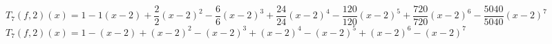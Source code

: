 \documentclass[a4paper]{article}
\begin{document}
$T_7(f,2)(x) = 1 - 1(x-2) + \dfrac{2}{2}(x-2)^2 - \dfrac{6}{6}(x-2)^3 + \dfrac{24}{24}(x-2)^4 - \dfrac{120}{120}(x-2)^5 + \dfrac{720}{720}(x-2)^6 - \dfrac{5040}{5040}(x-2)^7$ \\

$T_7(f,2)(x) = 1 - (x-2) + (x-2)^2 - (x-2)^3 + (x-2)^4 - (x-2)^5 + (x-2)^6 - (x-2)^7$ \\




















\begin{thebibliography}{999}
\end{thebibliography}
\end{document}
